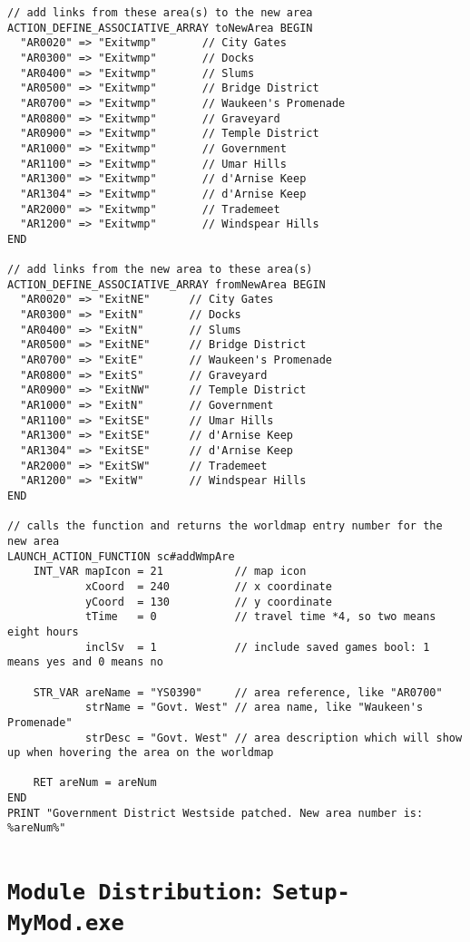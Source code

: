 \documentclass{article}
\def\DEFINE#1{{\tt \bf #1}\label{#1}\index{#1}}
\def\t#1{{\tt #1}}
\begin{document}
\begin{verbatim}
// add links from these area(s) to the new area
ACTION_DEFINE_ASSOCIATIVE_ARRAY toNewArea BEGIN
  "AR0020" => "Exitwmp"       // City Gates
  "AR0300" => "Exitwmp"       // Docks
  "AR0400" => "Exitwmp"       // Slums
  "AR0500" => "Exitwmp"       // Bridge District
  "AR0700" => "Exitwmp"       // Waukeen's Promenade
  "AR0800" => "Exitwmp"       // Graveyard
  "AR0900" => "Exitwmp"       // Temple District
  "AR1000" => "Exitwmp"       // Government
  "AR1100" => "Exitwmp"       // Umar Hills
  "AR1300" => "Exitwmp"       // d'Arnise Keep
  "AR1304" => "Exitwmp"       // d'Arnise Keep
  "AR2000" => "Exitwmp"       // Trademeet
  "AR1200" => "Exitwmp"       // Windspear Hills
END

// add links from the new area to these area(s)
ACTION_DEFINE_ASSOCIATIVE_ARRAY fromNewArea BEGIN
  "AR0020" => "ExitNE"      // City Gates
  "AR0300" => "ExitN"       // Docks
  "AR0400" => "ExitN"       // Slums
  "AR0500" => "ExitNE"      // Bridge District
  "AR0700" => "ExitE"       // Waukeen's Promenade
  "AR0800" => "ExitS"       // Graveyard
  "AR0900" => "ExitNW"      // Temple District
  "AR1000" => "ExitN"       // Government
  "AR1100" => "ExitSE"      // Umar Hills
  "AR1300" => "ExitSE"      // d'Arnise Keep
  "AR1304" => "ExitSE"      // d'Arnise Keep
  "AR2000" => "ExitSW"      // Trademeet
  "AR1200" => "ExitW"       // Windspear Hills
END

// calls the function and returns the worldmap entry number for the new area
LAUNCH_ACTION_FUNCTION sc#addWmpAre
    INT_VAR mapIcon = 21           // map icon
            xCoord  = 240          // x coordinate
            yCoord  = 130          // y coordinate
            tTime   = 0            // travel time *4, so two means eight hours
            inclSv  = 1            // include saved games bool: 1 means yes and 0 means no

    STR_VAR areName = "YS0390"     // area reference, like "AR0700"
            strName = "Govt. West" // area name, like "Waukeen's Promenade"
            strDesc = "Govt. West" // area description which will show up when hovering the area on the worldmap

    RET areNum = areNum
END
PRINT "Government District Westside patched. New area number is: %areNum%"
\end{verbatim}

\section{\DEFINE{Module Distribution}: \t{Setup-MyMod.exe}}
\end{document}
